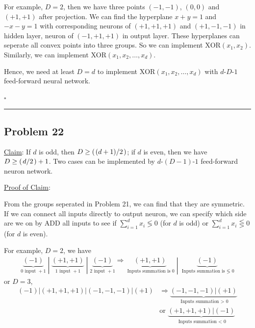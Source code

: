 \documentclass[12pt]{article}
\newcommand*{\QEDB}{\hfill\ensuremath{\square}}
\newcommand{\ParTh}[1]{\left(#1\right)}
\newcommand{\Divide}[2]{\left.#1\middle/#2\right.}
\newcommand{\horrule}[1]{\rule{\linewidth}{#1}}
\begin{document}
For example, $D=2$, then we have three points $\ParTh{-1,-1}$, $\ParTh{0,0}$ and $\ParTh{+1,+1}$ after projection. We can find the hyperplane $x+y=1$ and $-x-y=1$ with corresponding neurons of $\ParTh{+1,+1,+1}$ and $\ParTh{+1,-1,-1}$ in hidden layer, neuron of $\ParTh{-1,+1,+1}$ in output layer. These hyperplanes can seperate all convex points into three groups. So we can implement $\text{XOR}\ParTh{x_1,x_2}$. Similarly, we can implement $\text{XOR}\ParTh{x_1,x_2,\ldots,x_d}$.

Hence, we need at least $D=d$ to implement $\text{XOR}\ParTh{x_1,x_2,\ldots,x_d}$ with $d\text{-}D\text{-}1$ feed-forward neural network.

\QEDB

\horrule{0.5pt}

\subsection*{Problem 22}

\underline{Claim}: If $d$ is odd, then $D\geq \ParTh{\Divide{\ParTh{d+1}}{2}}$; if $d$ is even, then we have $D\geq \ParTh{\Divide{d}{2}}+1$. Two cases can be implemented by $d\text{-}\ParTh{D-1}\text{-}1$ feed-forward neuron network.

\underline{Proof of Claim}:

From the groups seperated in Problem 21, we can find that they are symmetric. If we can connect all inputs directly to output neuron, we can specify which side are we on by $\text{ADD}$ all inputs to see if $\sum_{i=1}^{d}x_i\lessgtr0$ (for $d$ is odd) or $\sum_{i=1}^{d}x_i\lesseqgtr0$ (for $d$ is even).

For example, $D=2$, we have
\begin{align}
\left.\underbrace{\ParTh{-1}}_{0\text{ input } +1}\middle|\underbrace{\ParTh{+1,+1}}_{1\text{ input } +1}\middle|\underbrace{\ParTh{-1}}_{2\text{ input } +1}\right.\Rightarrow\left.\underbrace{\ParTh{+1,+1}}_{\text{ Inputs summation is }0}\middle|\underbrace{\ParTh{-1}}_{\text{ Inputs summation is }\lessgtr\text{ 0}}\right.
\end{align}
or $D=3$,
\begin{align}
\left.{\ParTh{-1}}\Big\vert{\ParTh{+1,+1,+1}}\Big\vert{\ParTh{-1,-1,-1}}\Big\vert{\ParTh{+1}}\right.&\Rightarrow\underbrace{\left.{\ParTh{-1,-1,-1}}\Big\vert{\ParTh{+1}}\right.}_{\text{ Inputs summation }>\text{ 0}}\\
\nonumber
&\text{or }\underbrace{\left.{\ParTh{+1,+1,+1}}\Big\vert{\ParTh{-1}}\right.}_{\text{ Inputs summation }<\text{ 0}}
\end{align}
\end{document}
